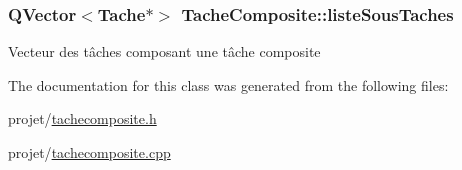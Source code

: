 \subsubsection[{liste\+Sous\+Taches}]{\setlength{\rightskip}{0pt plus 5cm}Q\+Vector$<${\bf Tache}$\ast$$>$ Tache\+Composite\+::liste\+Sous\+Taches\hspace{0.3cm}{\ttfamily [private]}}\label{class_tache_composite_ac73545ce9cef80cbdc145a233465df6e}
Vecteur des tâches composant une tâche composite 

The documentation for this class was generated from the following files\+:\begin{DoxyCompactItemize}
\item 
projet/\hyperlink{tachecomposite_8h}{tachecomposite.\+h}\item 
projet/\hyperlink{tachecomposite_8cpp}{tachecomposite.\+cpp}\end{DoxyCompactItemize}
